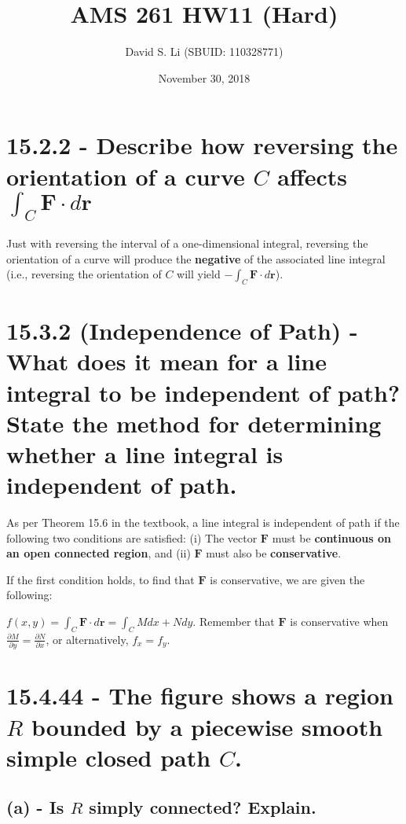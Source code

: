 \documentclass{article}
\title{AMS 261 HW11 (Hard)}
\author{David S. Li (SBUID: 110328771)}
\date{November 30, 2018}
\begin{document}
\maketitle

\section{15.2.2 - Describe how reversing the orientation of a curve $C$ affects $\int_{C}\textbf{F}\cdot d\textbf{r}$}

\par\noindent\Large Just with reversing the interval of a one-dimensional integral, reversing the orientation of a curve will produce the \textbf{negative} of the associated line integral (i.e., reversing the orientation of $C$ will yield $-\int_{C}\textbf{F}\cdot d\textbf{r}$).

\section{15.3.2 (Independence of Path) - What does it mean for a line integral to be independent of path?  State the method for determining whether a line integral is independent of path.}

\par\noindent\Large As per Theorem 15.6 in the textbook, a line integral is independent of path if the following two conditions are satisfied: (i) The vector $\textbf{F}$ must be \textbf{continuous on an open connected region}, and (ii) $\textbf{F}$ must also be \textbf{conservative}.\vspace{0.25cm}

\par\noindent\Large If the first condition holds, to find that $\textbf{F}$ is conservative, we are given the following:
\par\noindent\Large $f(x, y) = \int_{C}\textbf{F}\cdot d\textbf{r} = \int_{C}Mdx + Ndy$.  Remember that $\textbf{F}$ is conservative when $\frac{\partial M}{\partial y} = \frac{\partial N}{\partial x}$, or alternatively, $f_{x} = f_{y}$.

\section{15.4.44 - The figure shows a region $R$ bounded by a piecewise smooth simple closed path $C$.}
\subsection{(a) - Is $R$ simply connected?  Explain.}
\end{document}

